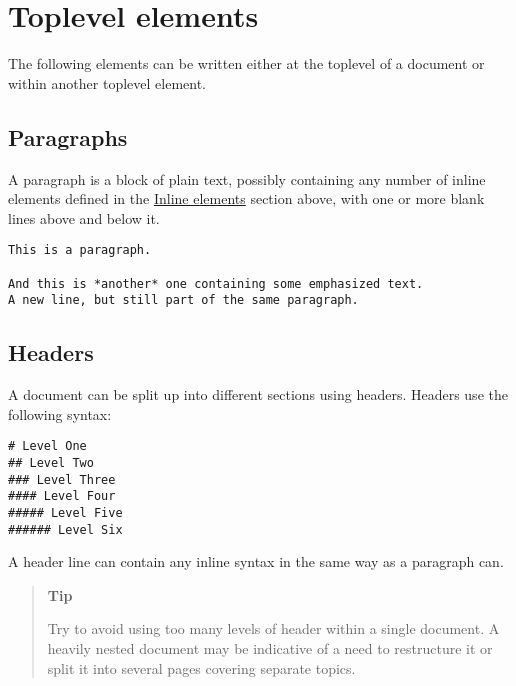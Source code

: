 \hypertarget{1299449328577314863}{}


\section{Toplevel elements}



The following elements can be written either at the {\textquotedbl}toplevel{\textquotedbl} of a document or within another {\textquotedbl}toplevel{\textquotedbl} element.



\hypertarget{7653906193491884111}{}


\subsection{Paragraphs}



A paragraph is a block of plain text, possibly containing any number of inline elements defined in the \hyperlink{17997341109973101587}{Inline elements} section above, with one or more blank lines above and below it.




\begin{lstlisting}
This is a paragraph.

And this is *another* one containing some emphasized text.
A new line, but still part of the same paragraph.
\end{lstlisting}



\hypertarget{14939650886219602329}{}


\subsection{Headers}



A document can be split up into different sections using headers. Headers use the following syntax:




\begin{verbatim}
# Level One
## Level Two
### Level Three
#### Level Four
##### Level Five
###### Level Six
\end{verbatim}



A header line can contain any inline syntax in the same way as a paragraph can.



\begin{quote}
\textbf{Tip}

Try to avoid using too many levels of header within a single document. A heavily nested document may be indicative of a need to restructure it or split it into several pages covering separate topics.

\end{quote}


